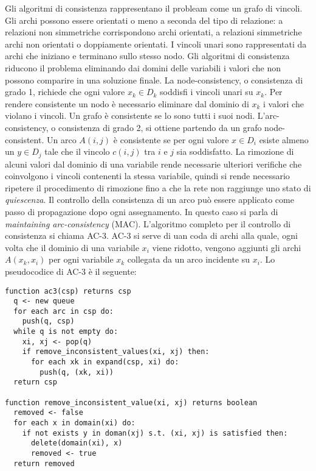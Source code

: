 \documentclass[answers, a4paper, 11pt]{exam}
\begin{document}
\begin{questions}
\begin{solution}
    Gli algoritmi di consistenza rappresentano il probleam come un grafo di vincoli. 
    Gli archi possono essere orientati o meno a seconda del tipo di relazione: a relazioni non simmetriche corrispondono archi orientati, a relazioni simmetriche archi non orientati o doppiamente orientati. 
    I vincoli unari sono rappresentati da archi che iniziano e terminano sullo stesso nodo. 
    Gli algoritmi di consistenza riducono il problema eliminando dai domini delle variabili i valori che non possono comparire in una soluzione finale. 
  La node-consistency, o consistenza di grado 1, richiede che ogni valore $x_k \in D_k$ soddisfi i vincoli unari su $x_k$. 
    Per rendere consistente un nodo è necessario eliminare dal dominio di $x_k$ i valori che violano i vincoli. 
    Un grafo è consistente se lo sono tutti i suoi nodi. 
    L'arc-consistency, o consistenza di grado 2, si ottiene partendo da un grafo node-consistent. 
    Un arco $A(i, j)$ è consistente se per ogni valore $x \in D_i$ esiste almeno un $y \in D_j$ tale che il vincolo $c(i, j)$ tra $i$ e $j$ sia soddisfatto. 
    La rimozione di alcuni valori dal dominio di una variabile rende necessarie ulteriori verifiche che coinvolgono i vincoli contenenti la stessa variabile, quindi si rende necessario ripetere il procedimento di rimozione fino a che la rete non raggiunge uno stato di \emph{quiescenza}. 
    Il controllo della consistenza di un arco può essere applicato come passo di propagazione dopo ogni assegnamento. 
    In questo caso si parla di \emph{maintaining arc-consistency} (MAC). 
    L'algoritmo completo per il controllo di consistenza si chiama AC-3. 
    AC-3 si serve di uan coda di archi alla quale, ogni volta che il dominio di una variabile $x_i$ viene ridotto, vengono aggiunti gli archi $A(x_k, x_i)$ per ogni variabile $x_k$ collegata da un arco incidente su $x_i$. 
    Lo pseudocodice di AC-3 è il seguente: 
\begin{verbatim}
function ac3(csp) returns csp
  q <- new queue
  for each arc in csp do:
    push(q, csp)
  while q is not empty do:
    xi, xj <- pop(q)
    if remove_inconsistent_values(xi, xj) then:
      for each xk in expand(csp, xi) do:
        push(q, (xk, xi))
  return csp

function remove_inconsistent_value(xi, xj) returns boolean
  removed <- false
  for each x in domain(xi) do:
    if not exists y in doman(xj) s.t. (xi, xj) is satisfied then:
      delete(domain(xi), x)
      removed <- true
  return removed
\end{verbatim}
  \end{solution}


\end{questions}
\end{document}
